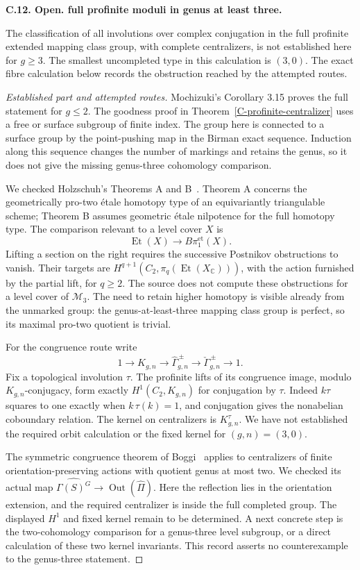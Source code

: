 \documentclass[11pt,oneside]{article}
\makeatletter
\newcounter{statementanchor}
\newenvironment{statement}[3]{%
 \refstepcounter{statementanchor}\def\@currentlabel{#1}%
 \par\addvspace{9pt}\noindent
 \textbf{#1. #2. #3.}\par\nobreak\noindent\ignorespaces
}{\par\addvspace{5pt}}
\makeatother
\begin{document}
\begin{statement}{C.12}{Open}{full profinite moduli in genus at least three}
\label{st:C.12}
\label{C-high-genus-open}
The classification of all involutions over complex
conjugation in the full profinite extended mapping
class group, with complete centralizers, is not
established here for $g\geq3$. The smallest
uncompleted type in this calculation is $(3,0)$.
The exact fibre calculation below records the
obstruction reached by the attempted routes.
\end{statement}
\begin{proof}[Established part and attempted routes]
Mochizuki's Corollary 3.15 proves the full
statement for $g\leq2$. The goodness proof
in Theorem~\ref{C-profinite-centralizer}
uses a free or surface subgroup of finite
index. The group here is connected to
a surface group by the point-pushing
map in the Birman exact sequence.
Induction along this sequence changes
the number of markings and retains
the genus, so it does not give the
missing genus-three cohomology
comparison.

We checked Holzschuh's Theorems A and
B~\cite{Holzschuh2025}. Theorem A
concerns the geometrically pro-two
étale homotopy type of an equivariantly
triangulable scheme; Theorem B assumes
geometric étale nilpotence for the
full homotopy type. The comparison
relevant to a level cover $X$ is
\[
 \operatorname{Et}(X)\longrightarrow
 B\pi_1^{\mathrm{et}}(X).
\]
Lifting a section on the right
requires the successive Postnikov
obstructions to vanish. Their
targets are
$H^{q+1}(C_2,\pi_q(\operatorname{Et}(X_{\mathbb C})))$,
with the action furnished by the
partial lift, for $q\geq2$.
The source does not compute these
obstructions for a level cover
of $\mathcal M_3$. The need to
retain higher homotopy is visible
already from the unmarked group:
the genus-at-least-three mapping
class group is perfect, so its
maximal pro-two quotient is trivial.

For the congruence route write
\[
 1\to K_{g,n}\to\widehat\Gamma^{\,\pm}_{g,n}
       \to\check\Gamma^{\,\pm}_{g,n}\to1 .
\]
Fix a topological involution $\tau$.
The profinite lifts of its congruence
image, modulo $K_{g,n}$-conjugacy,
form exactly $H^1(C_2,K_{g,n})$
for conjugation by $\tau$.
Indeed $k\tau$ squares to one
exactly when $k\,\tau(k)=1$,
and conjugation gives the
nonabelian coboundary relation.
The kernel on centralizers is
$K_{g,n}^{\tau}$.
We have not established the required
orbit calculation or the fixed
kernel for $(g,n)=(3,0)$.

The symmetric congruence theorem
of Boggi~\cite{Boggi2026} applies
to centralizers of finite
orientation-preserving actions
with quotient genus at most two.
We checked its actual map
$\widehat{\Gamma(S)^G}\to
\operatorname{Out}(\widehat\Pi)$.
Here the reflection lies in
the orientation extension, and
the required centralizer is
inside the full completed group.
The displayed $H^1$ and fixed
kernel remain to be determined.
A next concrete step is the
two-cohomology comparison for
a genus-three level subgroup,
or a direct calculation of
these two kernel invariants.
This record asserts no
counterexample to the
genus-three statement.
\end{proof}
\end{document}
